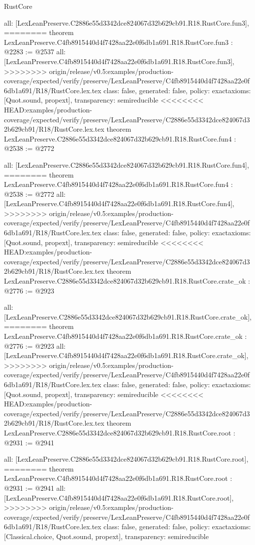 \begin{lexlean}{RustCore}
\begin{coremodule}
{\begin{coremodule}
{{{{{{  all: [LexLeanPreserve.C2886e55d3342dce824067d32b629cb91.R18.RustCore.fun3],
========
theorem LexLeanPreserve.C4fb8915440d4f7428aa22e0f6db1a691.R18.RustCore.fun3 : @2283 := @2537 {
  all: [LexLeanPreserve.C4fb8915440d4f7428aa22e0f6db1a691.R18.RustCore.fun3],
>>>>>>>> origin/release/v0.5:examples/production-coverage/expected/verify/preserve/LexLeanPreserve/C4fb8915440d4f7428aa22e0f6db1a691/R18/RustCore.lex.tex
  class: false,
  generated: false,
  policy: exact{axioms: [Quot.sound, propext]},
  transparency: semireducible
}
<<<<<<<< HEAD:examples/production-coverage/expected/verify/preserve/LexLeanPreserve/C2886e55d3342dce824067d32b629cb91/R18/RustCore.lex.tex
theorem LexLeanPreserve.C2886e55d3342dce824067d32b629cb91.R18.RustCore.fun4 : @2538 := @2772 {
  all: [LexLeanPreserve.C2886e55d3342dce824067d32b629cb91.R18.RustCore.fun4],
========
theorem LexLeanPreserve.C4fb8915440d4f7428aa22e0f6db1a691.R18.RustCore.fun4 : @2538 := @2772 {
  all: [LexLeanPreserve.C4fb8915440d4f7428aa22e0f6db1a691.R18.RustCore.fun4],
>>>>>>>> origin/release/v0.5:examples/production-coverage/expected/verify/preserve/LexLeanPreserve/C4fb8915440d4f7428aa22e0f6db1a691/R18/RustCore.lex.tex
  class: false,
  generated: false,
  policy: exact{axioms: [Quot.sound, propext]},
  transparency: semireducible
}
<<<<<<<< HEAD:examples/production-coverage/expected/verify/preserve/LexLeanPreserve/C2886e55d3342dce824067d32b629cb91/R18/RustCore.lex.tex
theorem LexLeanPreserve.C2886e55d3342dce824067d32b629cb91.R18.RustCore.crate_ok : @2776 := @2923 {
  all: [LexLeanPreserve.C2886e55d3342dce824067d32b629cb91.R18.RustCore.crate_ok],
========
theorem LexLeanPreserve.C4fb8915440d4f7428aa22e0f6db1a691.R18.RustCore.crate_ok : @2776 := @2923 {
  all: [LexLeanPreserve.C4fb8915440d4f7428aa22e0f6db1a691.R18.RustCore.crate_ok],
>>>>>>>> origin/release/v0.5:examples/production-coverage/expected/verify/preserve/LexLeanPreserve/C4fb8915440d4f7428aa22e0f6db1a691/R18/RustCore.lex.tex
  class: false,
  generated: false,
  policy: exact{axioms: [Quot.sound, propext]},
  transparency: semireducible
}
<<<<<<<< HEAD:examples/production-coverage/expected/verify/preserve/LexLeanPreserve/C2886e55d3342dce824067d32b629cb91/R18/RustCore.lex.tex
theorem LexLeanPreserve.C2886e55d3342dce824067d32b629cb91.R18.RustCore.root : @2931 := @2941 {
  all: [LexLeanPreserve.C2886e55d3342dce824067d32b629cb91.R18.RustCore.root],
========
theorem LexLeanPreserve.C4fb8915440d4f7428aa22e0f6db1a691.R18.RustCore.root : @2931 := @2941 {
  all: [LexLeanPreserve.C4fb8915440d4f7428aa22e0f6db1a691.R18.RustCore.root],
>>>>>>>> origin/release/v0.5:examples/production-coverage/expected/verify/preserve/LexLeanPreserve/C4fb8915440d4f7428aa22e0f6db1a691/R18/RustCore.lex.tex
  class: false,
  generated: false,
  policy: exact{axioms: [Classical.choice, Quot.sound, propext]},
  transparency: semireducible
}

}}}}}}}}}
\end{coremodule}}
\end{coremodule}
\end{lexlean}
